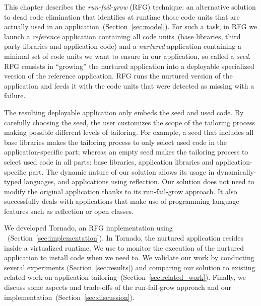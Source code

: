 This chapter describes the \emph{run-fail-grow} (RFG) technique: an alternative solution to dead code elimination that identifies at runtime those code units that are actually used in an application~(Section~\ref{sec:model}).
For such a task, in RFG we launch a \emph{reference} application containing all code units~(base libraries, third party libraries and application code) and a \emph{nurtured} application containing a minimal set of code units we want to ensure in our application, so called a \emph{seed}.
RFG consists in ``growing'' the nurtured application into a deployable specialized version of the reference application. 
RFG runs the nurtured version of the application and feeds it with the code units that were detected as missing with a failure.

The resulting deployable application only embeds the seed and used code.
By carefully choosing the seed, the user customizes the scope of the tailoring process making possible different levels of tailoring.
For example, a seed that includes all base libraries makes the tailoring process to only select used code in the application-specific part; whereas an empty seed makes the tailoring process to select used code in all parts: base libraries, application libraries and application-specific part.
The dynamic nature of our solution allows its usage in dynamically-typed languages, and applications using reflection. Our solution does not need to modify the original application thanks to its run-fail-grow approach.
It also successfully deals with applications that make use of programming language features such as reflection or open classes.

We developed Tornado, an RFG implementation using \Vtt~(Section~\ref{sec:implementation}). In Tornado, the nurtured application resides inside a virtualized runtime. We use \Vtt to monitor the execution of the nurtured application to install code when we need to. We validate our work by conducting several experiments (Section~\ref{sec:results}) and comparing our solution to existing related work on application tailoring~(Section~\ref{sec:related_work}).
Finally, we discuss some aspects and trade-offs of the run-fail-grow approach and our implementation~(Section~\ref{sec:discussion}).

